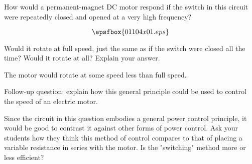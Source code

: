 

How would a permanent-magnet DC motor respond if the switch in this circuit were repeatedly closed and opened at a very high frequency?  

$$\epsfbox{01104x01.eps}$$

Would it rotate at full speed, just the same as if the switch were closed all the time?  Would it rotate at all?  Explain your answer.







The motor would rotate at some speed less than full speed.

\vskip 10pt

Follow-up question: explain how this general principle could be used to control the speed of an electric motor.







Since the circuit in this question embodies a general power control principle, it would be good to contrast it against other forms of power control.  Ask your students how they think this method of control compares to that of placing a variable resistance in series with the motor.  Is the "switching" method more or less efficient?




